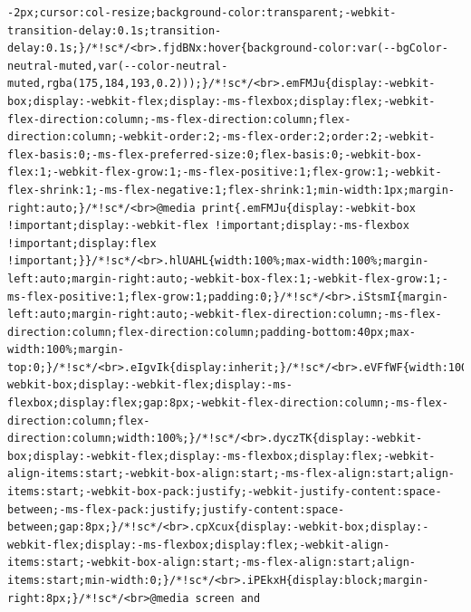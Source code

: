 \documentclass[
  letterpaper,
]{book}
\begin{document}
\begin{verbatim}
-2px;cursor:col-resize;background-color:transparent;-webkit-transition-delay:0.1s;transition-delay:0.1s;}/*!sc*/<br>.fjdBNx:hover{background-color:var(--bgColor-neutral-muted,var(--color-neutral-muted,rgba(175,184,193,0.2)));}/*!sc*/<br>.emFMJu{display:-webkit-box;display:-webkit-flex;display:-ms-flexbox;display:flex;-webkit-flex-direction:column;-ms-flex-direction:column;flex-direction:column;-webkit-order:2;-ms-flex-order:2;order:2;-webkit-flex-basis:0;-ms-flex-preferred-size:0;flex-basis:0;-webkit-box-flex:1;-webkit-flex-grow:1;-ms-flex-positive:1;flex-grow:1;-webkit-flex-shrink:1;-ms-flex-negative:1;flex-shrink:1;min-width:1px;margin-right:auto;}/*!sc*/<br>@media print{.emFMJu{display:-webkit-box !important;display:-webkit-flex !important;display:-ms-flexbox !important;display:flex !important;}}/*!sc*/<br>.hlUAHL{width:100%;max-width:100%;margin-left:auto;margin-right:auto;-webkit-box-flex:1;-webkit-flex-grow:1;-ms-flex-positive:1;flex-grow:1;padding:0;}/*!sc*/<br>.iStsmI{margin-left:auto;margin-right:auto;-webkit-flex-direction:column;-ms-flex-direction:column;flex-direction:column;padding-bottom:40px;max-width:100%;margin-top:0;}/*!sc*/<br>.eIgvIk{display:inherit;}/*!sc*/<br>.eVFfWF{width:100%;}/*!sc*/<br>.fywjmm{display:-webkit-box;display:-webkit-flex;display:-ms-flexbox;display:flex;gap:8px;-webkit-flex-direction:column;-ms-flex-direction:column;flex-direction:column;width:100%;}/*!sc*/<br>.dyczTK{display:-webkit-box;display:-webkit-flex;display:-ms-flexbox;display:flex;-webkit-align-items:start;-webkit-box-align:start;-ms-flex-align:start;align-items:start;-webkit-box-pack:justify;-webkit-justify-content:space-between;-ms-flex-pack:justify;justify-content:space-between;gap:8px;}/*!sc*/<br>.cpXcux{display:-webkit-box;display:-webkit-flex;display:-ms-flexbox;display:flex;-webkit-align-items:start;-webkit-box-align:start;-ms-flex-align:start;align-items:start;min-width:0;}/*!sc*/<br>.iPEkxH{display:block;margin-right:8px;}/*!sc*/<br>@media screen and 
\end{verbatim}
\end{document}
